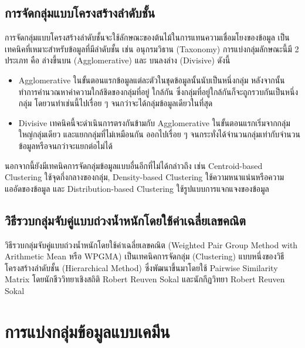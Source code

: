 \subsection{การจัดกลุ่มแบบโครงสร้างลำดับชั้น}
\label{ssec:hierar_clustering}

การจัดกลุ่มแบบโครงสร้างลำดับชั้นจะใช้ลักษณะของต้นไม้ในการแทนความเชื่อมโยงของข้อมูล เป็นเทคนิคที่เหมาะสำหรับข้อมูลที่มีลำดับชั้น เช่น 
อนุกรมวิธาน (Taxonomy) การแบ่งกลุ่มลักษณะนี้มี 2 ประเภท คือ ล่างขึ้นบน (Agglomerative) และ บนลงล่าง (Divisive) ดังนี้ 

\begin{itemize}
    \item Agglomerative ในขั้นตอนแรกข้อมูลแต่ละตัวในชุดข้อมูลนั้นนับเป็นหนึ่งกลุ่ม หลังจากนั้นทำการคำนวณหาค่าความใกล้ชิดของกลุ่มที่อยู่%
    ใกล้กัน ซึ่งกลุ่มที่อยู่ใกล้กันก็จะถูกรวบกันเป็นหนึ่งกลุ่ม โดยวนทำเช่นนี้ไปเรื่อย ๆ จนกว่าจะได้กลุ่มข้อมูลเดียวในที่สุด
    \item Divisive เทคนิคนี้จะดำเนินการตรงกันข้ามกับ Agglomerative ในขั้นตอนแรกเริ่มจากกลุ่มใหญ่กลุ่มเดียว และแยกกลุ่มที่ไม่เหมือนกัน%
    ออกไปเรื่อย ๆ จนกระทั่งได้จำนวนกลุ่มเท่ากับจำนวนข้อมูลหรือจนกว่าจะแยกต่อไม่ได้ 
\end{itemize}

นอกจากนี้ยังมีเทคนิคการจัดกลุ่มข้อมูลแบบอื่นอีกที่ไม่ได้กล่าวถึง เช่น Centroid-based Clustering ใช้จุดกึ่งกลางของกลุ่ม, Density-based 
Clustering ใช้ความหนาแน่นหรือความแออัดของข้อมูล และ Distribution-based Clustering ใช้รูปแบบการแจกแจงของข้อมูล

\subsection{วิธีรวบกลุ่มจับคู่แบบถ่วงน้ำหนักโดยใช้ค่าเฉลี่ยเลขคณิต}
\label{ssec:wpgma}

วิธีรวบกลุ่มจับคู่แบบถ่วงน้ำหนักโดยใช้ค่าเฉลี่ยเลขคณิต (Weighted Pair Group Method with Arithmetic Mean หรือ WPGMA) 
เป็นเทคนิคการจัดกลุ่ม (Clustering) แบบหนึ่งของวิธีโครงสร้างลำดับชั้น (Hierarchical Method) ซึ่งพัฒนาขึ้นมาโดยใช้ Pairwise 
Similarity Matrix\autocite{sokal1958} โดยนักชีววิทยาเชิงสถิติ Robert Reuven Sokal และนักกีฏวิทยา Robert Reuven Sokal

\section{การแบ่งกลุ่มข้อมูลแบบเคมีน}
\label{sec:k_means}

